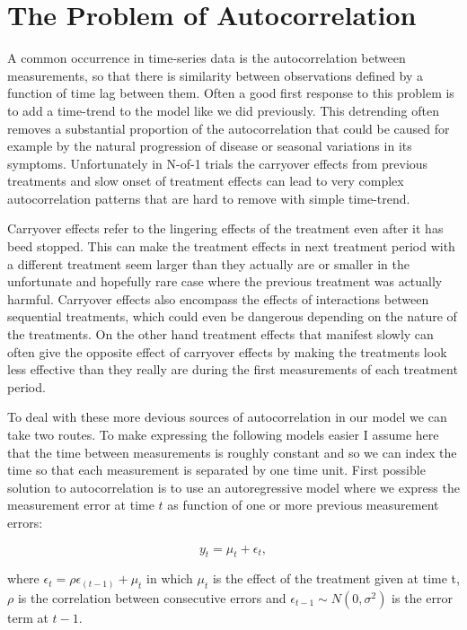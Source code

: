 \documentclass[12pt,a4paper,leqno]{report}
\theoremstyle{plain}
\theoremstyle{definition}
\theoremstyle{remark}
\begin{document}
\section{The Problem of Autocorrelation}\label{autocor}

A common occurrence in time-series data is the autocorrelation between
measurements, so that there is similarity between observations defined by
a function of time lag between them. Often a good first response to this problem
is to add a time-trend to the model like we did previously.
This detrending often removes a substantial proportion of the autocorrelation
that could be caused for example by the natural progression of disease or seasonal
variations in its symptoms\cite{stat}. Unfortunately in N-of-1 trials the carryover effects
from previous treatments and slow onset of treatment effects can lead to very complex
autocorrelation patterns that are hard to remove with simple time-trend.

Carryover effects refer to the lingering effects of the treatment even after it has
beed stopped. This can make the treatment effects in next treatment period with
a different treatment seem larger than they actually are or smaller in the unfortunate
and hopefully rare case where the previous treatment was actually harmful. Carryover effects also
encompass the effects of interactions between sequential treatments, which could
even be dangerous depending on the nature of the treatments. On the other hand treatment
effects that manifest slowly can often give the opposite effect of carryover effects by making
the treatments look less effective than they really are during the first measurements of
each treatment period.\cite{stat}

To deal with these more devious sources of autocorrelation in our model we can take two routes.
To make expressing the following models easier I assume here that the time between measurements
is roughly constant and so we can index the time so that each measurement is separated by one
time unit. First possible solution to autocorrelation is to use an autoregressive model where
we express the measurement error at time \(t\) as function of one or more previous measurement errors:

\begin{def}\label{}
    \begin{equation}\label{}
        y_t = \mu_t + \epsilon_t,
    \end{equation}
\end{def}where \(\epsilon_t = \rho\epsilon_{(t - 1)} + \mu_t\) in which
\(\mu_t\) is the effect of the treatment given at time t,
\(\rho \) is the correlation between consecutive errors and
\(\epsilon_{t-1} \sim N(0,\sigma^2) \) is the error term at \(t-1\).
\end{document}

